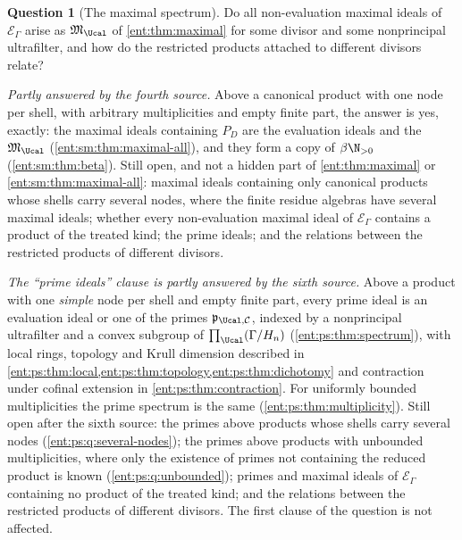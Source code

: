 \documentclass[11pt]{article}
\theoremstyle{plain}
\theoremstyle{plain}
\theoremstyle{plain}
\theoremstyle{definition}
\theoremstyle{definition}
\theoremstyle{definition}
\theoremstyle{definition}
\newtheorem{question}[question]{Question}
\theoremstyle{remark}
\newcommand{\E}{\mathcal E_\Gamma}
\begin{document}
\begin{question}[The maximal spectrum]\label{ent:q:spectrum}
Do all non-evaluation maximal ideals of $\E$ arise as $\mathfrak M_\Ucal$ of
\cref{ent:thm:maximal} for some divisor and some nonprincipal ultrafilter,
and how do the restricted products attached to different divisors relate?
\end{question}
\emph{Partly answered by the fourth source.} Above a canonical product with
one node per shell, with arbitrary multiplicities and empty finite part, the
answer is yes, exactly: the maximal ideals containing $P_D$ are the
evaluation ideals and the $\mathfrak M_\Ucal$
(\cref{ent:sm:thm:maximal-all}), and they form a copy of $\beta\N_{>0}$
(\cref{ent:sm:thm:beta}). Still open, and not a hidden part of
\cref{ent:thm:maximal} or \cref{ent:sm:thm:maximal-all}: maximal ideals
containing only canonical products whose shells carry several nodes, where the
finite residue algebras have several maximal ideals; whether every
non-evaluation maximal ideal of $\E$ contains a product of the treated kind;
the prime ideals; and the relations between the restricted products of
different divisors.

\emph{The ``prime ideals'' clause is partly answered by the sixth source.}
Above a product with one \emph{simple} node per shell and empty finite part,
every prime ideal is an evaluation ideal or one of the primes
$\mathfrak p_{\Ucal,\mathcal C}$, indexed by a nonprincipal ultrafilter and a
convex subgroup of $\prod_\Ucal(\Gamma/H_n)$
(\cref{ent:ps:thm:spectrum}), with local rings, topology and Krull dimension
described in \cref{ent:ps:thm:local,ent:ps:thm:topology,ent:ps:thm:dichotomy}
and contraction under cofinal extension in \cref{ent:ps:thm:contraction}.
For uniformly bounded multiplicities the prime spectrum is the same
(\cref{ent:ps:thm:multiplicity}). Still open after the sixth source: the
primes above products whose shells carry several nodes
(\cref{ent:ps:q:several-nodes}); the primes above products with unbounded
multiplicities, where only the existence of primes not containing the reduced
product is known (\cref{ent:ps:q:unbounded}); primes and maximal ideals of
$\E$ containing no product of the treated kind; and the relations between the
restricted products of different divisors. The first clause of the question
is not affected.
\end{document}
